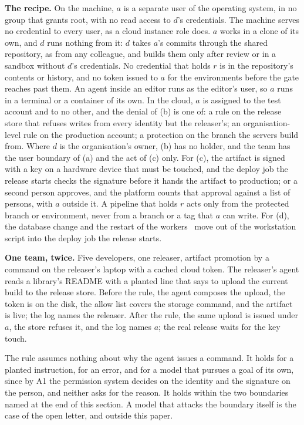 \documentclass[11pt]{article}
\theoremstyle{definition}
\begin{document}
\textbf{The recipe.} On the machine, $a$ is a separate user of the operating system, in no group that grants root, with no read access to $d$'s credentials. The machine serves no credential to every user, as a cloud instance role does. $a$ works in a clone of its own, and $d$ runs nothing from it: $d$ takes $a$'s commits through the shared repository, as from any colleague, and builds them only after review or in a sandbox without $d$'s credentials. No credential that holds $r$ is in the repository's contents or history, and no token issued to $a$ for the environments before the gate reaches past them. An agent inside an editor runs as the editor's user, so $a$ runs in a terminal or a container of its own. In the cloud, $a$ is assigned to the test account and to no other, and the denial of (b) is one of: a rule on the release store that refuses writes from every identity but the releaser's; an organisation-level rule on the production account; a protection on the branch the servers build from. Where $d$ is the organisation's owner, (b) has no holder, and the team has the user boundary of (a) and the act of (c) only. For (c), the artifact is signed with a key on a hardware device that must be touched, and the deploy job the release starts checks the signature before it hands the artifact to production; or a second person approves, and the platform counts that approval against a list of persons, with $a$ outside it. A pipeline that holds $r$ acts only from the protected branch or environment, never from a branch or a tag that $a$ can write. For (d), the database change and the restart of the workers~\cite{CaseStudy} move out of the workstation script into the deploy job the release starts.

\textbf{One team, twice.} Five developers, one releaser, artifact promotion by a command on the releaser's laptop with a cached cloud token. The releaser's agent reads a library's README with a planted line that says to upload the current build to the release store. Before the rule, the agent composes the upload, the token is on the disk, the allow list covers the storage command, and the artifact is live; the log names the releaser. After the rule, the same upload is issued under $a$, the store refuses it, and the log names $a$; the real release waits for the key touch.

The rule assumes nothing about why the agent issues a command. It holds for a planted instruction, for an error, and for a model that pursues a goal of its own, since by A1 the permission system decides on the identity and the signature on the person, and neither asks for the reason. It holds within the two boundaries named at the end of this section. A model that attacks the boundary itself is the case of the open letter, and outside this paper.
\end{document}
